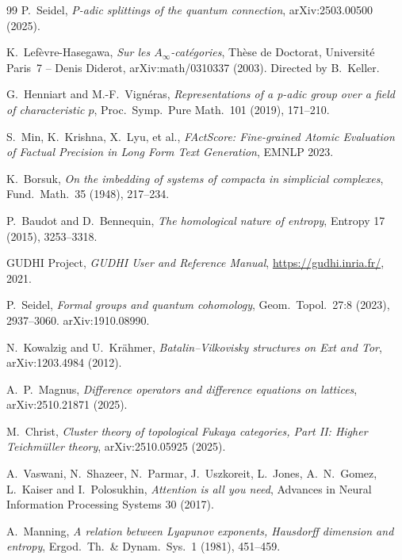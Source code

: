 \documentclass[11pt]{amsart}
\theoremstyle{definition}
\begin{document}
\begin{thebibliography}{99}
  P.~Seidel,
  \emph{P-adic splittings of the quantum connection},
  arXiv:2503.00500 (2025).

  K.~Lef\`evre-Hasegawa,
  \emph{Sur les $A_\infty$-cat\'egories},
  Th\`ese de Doctorat, Universit\'e Paris~7 -- Denis Diderot,
  arXiv:math/0310337 (2003).
  Directed by B.~Keller.

  G.~Henniart and M.-F.\ Vign\'eras,
  \emph{Representations of a p-adic group over a field of characteristic $p$},
  Proc.\ Symp.\ Pure Math.\ 101 (2019), 171--210.

  S.~Min, K.~Krishna, X.~Lyu, et al.,
  \emph{FActScore: Fine-grained Atomic Evaluation of Factual Precision
  in Long Form Text Generation}, EMNLP 2023.

  K.~Borsuk,
  \emph{On the imbedding of systems of compacta in simplicial complexes},
  Fund.\ Math.\ 35 (1948), 217--234.

  P.~Baudot and D.~Bennequin,
  \emph{The homological nature of entropy},
  Entropy 17 (2015), 3253--3318.

  GUDHI Project,
  \emph{GUDHI User and Reference Manual},
  \url{https://gudhi.inria.fr/}, 2021.

  P.~Seidel,
  \emph{Formal groups and quantum cohomology},
  Geom.\ Topol.\ 27:8 (2023), 2937--3060.
  arXiv:1910.08990.

  N.~Kowalzig and U.~Kr\"ahmer,
  \emph{Batalin--Vilkovisky structures on Ext and Tor},
  arXiv:1203.4984 (2012).

  A.~P.~Magnus,
  \emph{Difference operators and difference equations on lattices},
  arXiv:2510.21871 (2025).

  M.~Christ,
  \emph{Cluster theory of topological Fukaya categories, Part II:
  Higher Teichm\"uller theory},
  arXiv:2510.05925 (2025).

  A.~Vaswani, N.~Shazeer, N.~Parmar, J.~Uszkoreit, L.~Jones, A.~N.~Gomez,
  L.~Kaiser and I.~Polosukhin,
  \emph{Attention is all you need},
  Advances in Neural Information Processing Systems 30 (2017).

  A.~Manning,
  \emph{A relation between Lyapunov exponents, Hausdorff dimension
  and entropy}, Ergod.\ Th.\ \& Dynam.\ Sys.\ 1 (1981), 451--459.


\end{thebibliography}
\end{document}
